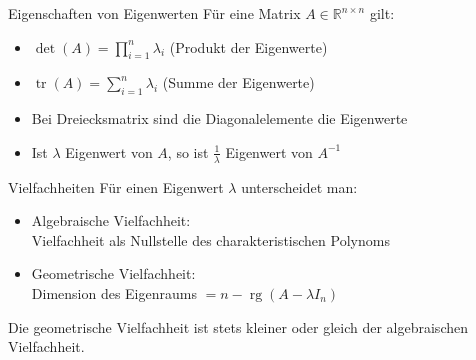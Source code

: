 \begin{theorem}{Eigenschaften von Eigenwerten}
Für eine Matrix $A \in \mathbb{R}^{n\times n}$ gilt:
\begin{itemize}
    \item $\det(A) = \prod_{i=1}^n \lambda_i$ (Produkt der Eigenwerte)
    \item $\operatorname{tr}(A) = \sum_{i=1}^n \lambda_i$ (Summe der Eigenwerte)
    \item Bei Dreiecksmatrix sind die Diagonalelemente die Eigenwerte
    \item Ist $\lambda$ Eigenwert von $A$, so ist $\frac{1}{\lambda}$ Eigenwert von $A^{-1}$
\end{itemize}
\end{theorem}

\begin{concept}{Vielfachheiten}
Für einen Eigenwert $\lambda$ unterscheidet man:
\begin{itemize}
    \item Algebraische Vielfachheit: \\Vielfachheit als Nullstelle des charakteristischen Polynoms
    \item Geometrische Vielfachheit: \\Dimension des Eigenraums $= n - \operatorname{rg}(A-\lambda I_n)$
\end{itemize}
Die geometrische Vielfachheit ist stets kleiner oder gleich der algebraischen Vielfachheit.
\end{concept}

